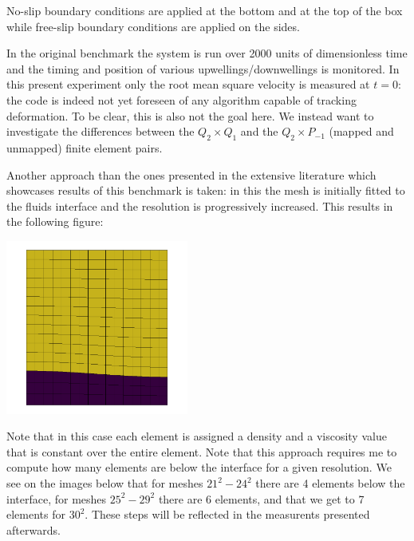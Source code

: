 No-slip boundary conditions are applied at the bottom and at the top of the box 
while free-slip boundary conditions are applied on the sides. 

In the original benchmark the system is run over 2000 units of dimensionless time and the 
timing and position of various upwellings/downwellings is monitored. 
In this present experiment only the root mean square velocity is measured at $t=0$:
the code is indeed not yet foreseen of any algorithm capable of tracking deformation.
To be clear, this is also not the goal here. We instead want to investigate the 
differences between the $Q_2\times Q_1$ and the $Q_2\times P_{-1}$ (mapped and unmapped)
finite element pairs.

Another approach than the ones presented in the extensive literature which showcases 
results of this benchmark is taken: in this \stone the mesh is initially fitted to the fluids
interface and the resolution is progressively increased. This results in the 
following figure:

\begin{center}
\includegraphics[width=6cm]{python_codes/fieldstone_25/newresults/mats}
\end{center}
Note that in this case each element is assigned a density and a viscosity value that 
is constant over the entire element. 
Note that this approach requires me to compute how many elements are below the interface
for a given resolution. We see on the images below that for meshes $21^2-24^2$ there 
are 4 elements below the interface, for meshes $25^2-29^2$ there are 6 elements, and that 
we get to 7 elements for $30^2$. These steps will be reflected in the measurents presented 
afterwards.

